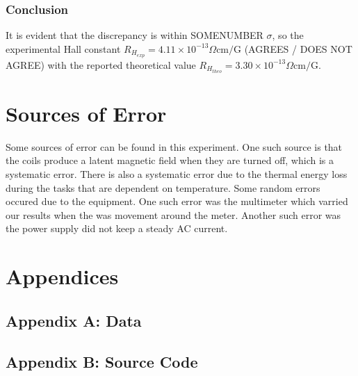\documentclass[a4paper]{article}
\begin{document}
\subsubsection{Conclusion}
\qq It is evident that the discrepancy is within SOMENUMBER $\sigma$,
so the experimental Hall constant $R_{H_{exp}} = 4.11 \times 10^{-13}
\Omega \text{cm/G}$ (AGREES / DOES NOT AGREE) with the reported
theoretical value $R_{H_{theo}} = 3.30 \times 10^{-13} \Omega
\text{cm/G}$.

\section{Sources of Error}
\qq Some sources of error can be found in this experiment. One such
source is that the coils produce a latent magnetic field when they are
turned off, which is a systematic error. There is also a systematic
error due to the thermal energy loss during the tasks that are
dependent on temperature. Some random errors occured due to the
equipment. One such error was the multimeter which varried our results
when the was movement around the meter. Another such error was the
power supply did not keep a steady AC current.

\section{Appendices}

\subsection{Appendix A: Data}

\subsection{Appendix B: Source Code}
\end{document}
